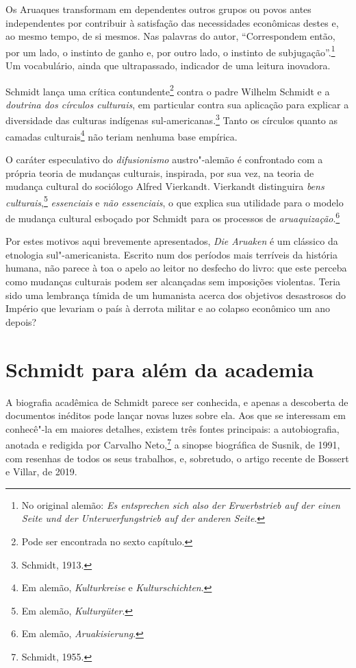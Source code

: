Os Aruaques transformam em dependentes outros grupos ou povos antes independentes por contribuir à satisfação das necessidades econômicas destes e, ao mesmo tempo, de si mesmos. Nas palavras do autor, ``Correspondem então, por um lado, o instinto de ganho e, por outro lado, o instinto de subjugação''.\footnote{No original alemão: \textit{Es entsprechen sich also der Erwerbstrieb auf der einen Seite und der Unterwerfungstrieb auf der anderen Seite}.} Um vocabulário, ainda que ultrapassado, indicador de uma leitura inovadora.

Schmidt lança uma crítica contundente\footnote{Pode ser encontrada no sexto capítulo.} contra o padre Wilhelm Schmidt e a \textit{doutrina dos círculos culturais}, em particular contra sua aplicação para explicar a diversidade das culturas indígenas sul-americanas.\footnote{Schmidt, 1913.} Tanto os círculos quanto as camadas culturais\footnote{Em alemão, \textit{Kulturkreise} e \textit{Kulturschichten}.} não teriam nenhuma base empírica. 

O caráter especulativo do \textit{difusionismo} austro"-alemão é confrontado com a própria teoria de mudanças culturais, inspirada, por sua vez, na teoria de mudança cultural do sociólogo Alfred Vierkandt. Vierkandt distinguira \textit{bens culturais},\footnote{Em alemão, \textit{Kulturgüter}.} \textit{essenciais} e \textit{não essenciais}, o que explica sua utilidade para o modelo de mudança cultural esboçado por Schmidt para os processos de \textit{aruaquização}.\footnote{Em alemão, \textit{Aruakisierung}.}

Por estes motivos aqui brevemente apresentados, \textit{Die Aruaken} é um clássico da etnologia sul"-americanista. Escrito num dos períodos mais terríveis da história humana, não parece à toa o apelo ao leitor no desfecho do livro: que este perceba como mudanças culturais podem ser alcançadas sem imposições violentas. Teria sido uma lembrança tímida de um humanista acerca dos objetivos desastrosos do Império que levariam o país à derrota militar e ao colapso econômico um ano depois?

\section{Schmidt para além da academia}

A biografia acadêmica de Schmidt parece ser conhecida, e apenas a descoberta de documentos inéditos pode lançar novas luzes sobre ela. Aos que se interessam em conhecê"-la em maiores detalhes, existem três fontes principais: a autobiografia, anotada e redigida por Carvalho Neto,\footnote{Schmidt, 1955.} a sinopse biográfica de Susnik, de 1991, com resenhas de todos os seus trabalhos, e, sobretudo, o artigo recente de Bossert e Villar, de 2019. 

